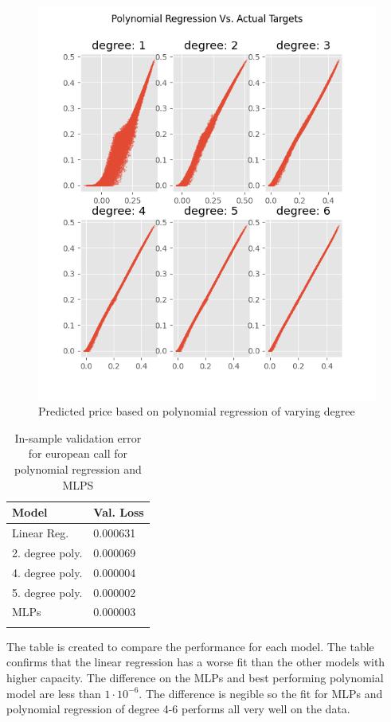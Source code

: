 \begin{figure}[th]
\centering
\includegraphics{Figures/polynomialEuroC.png}
\decoRule
\caption[Polynomial Regression Predictions Vs. Actual Prices]{Predicted price based on polynomial regression of varying degree}
\label{fig:PolynomialEuroC}
\end{figure}

\begin{table}[th]
\caption{In-sample validation error for european call for polynomial regression and MLPS}
\label{tab:euroPerformance}
\centering
\begin{tabular}{l l}
\toprule
\textbf{Model} & \textbf{Val. Loss} \\
\midrule
Linear Reg. & 0.000631 \\
2. degree  poly.  & 0.000069 \\
4. degree poly.  & 0.000004 \\
5. degree poly.  & 0.000002 \\
MLPs        & 0.000003\\
\bottomrule\\
\end{tabular}
\end{table}
The table is created to compare the performance for each model. The table confirms that the linear regression has a worse fit than the other models with higher capacity. The difference on the MLPs and best performing polynomial model are less than $1\cdot 10^{-6}$. The difference is negible so the fit for MLPs and polynomial regression of degree 4-6 performs all very well on the data.


